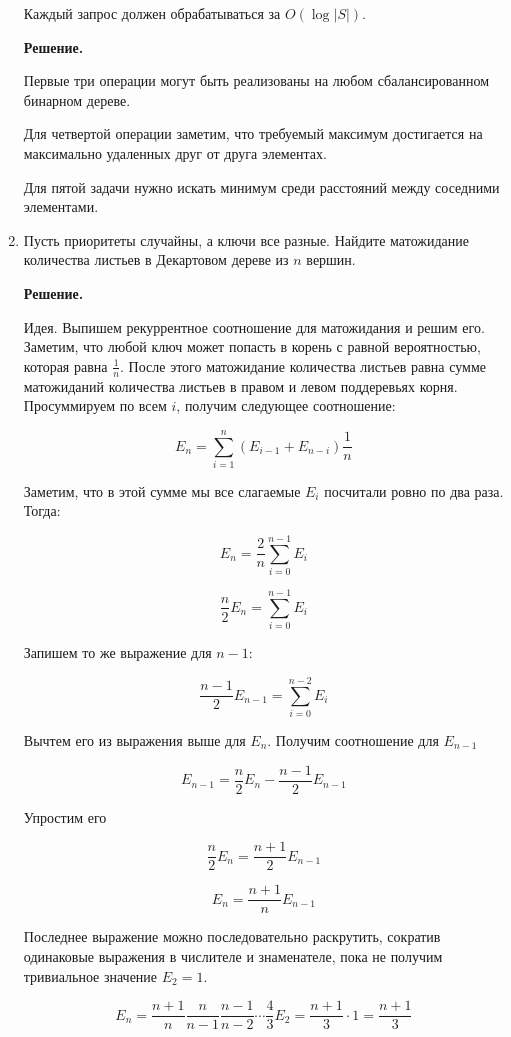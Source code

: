 \begin{enumerate}
	Каждый запрос должен обрабатываться за $O(\log |S|)$.
	
	\textbf{Решение.}
	
	Первые три операции могут быть реализованы на любом сбалансированном бинарном дереве. 
	
	Для четвертой операции заметим, что требуемый максимум достигается на максимально удаленных друг от друга элементах.
	
	Для пятой задачи нужно искать минимум среди расстояний между соседними элементами. 
	
	\item Пусть приоритеты случайны, а ключи все разные. Найдите матожидание количества листьев в
	Декартовом дереве из $n$ вершин.
	
	\textbf{Решение.}
	
	Идея. Выпишем рекуррентное соотношение для матожидания и решим его.
	Заметим, что любой ключ может попасть в корень с равной вероятностью, которая равна 
	$\frac{1}{n}$. После этого матожидание количества листьев равна сумме матожиданий количества листьев в правом и левом поддеревьях корня. Просуммируем по всем $i$, получим следующее соотношение:
	
	$$E_n = \sum\limits_{i = 1}^{n} (E_{i - 1} + E_{n - i}) \frac{1}{n}$$
	
	Заметим, что в этой сумме мы все слагаемые $E_i$ посчитали ровно по два раза. Тогда:
	
	$$E_n = \frac{2}{n} \sum\limits_{i = 0}^{n - 1} E_i$$
	
	$$\frac{n}{2} E_n = \sum\limits_{i = 0}^{n - 1} E_i$$
	
	Запишем то же выражение для $n - 1$:
	
	$$\frac{n - 1}{2}E_{n - 1} = \sum\limits_{i = 0}^{n - 2} E_i$$

	Вычтем его из выражения выше для $E_n$. Получим соотношение для $E_{n - 1}$
	
	$$E_{n - 1} = \frac{n}{2} E_{n} - \frac{n - 1}{2} E_{n - 1}$$
	
	Упростим его
	
	$$\frac{n}{2} E_n = \frac{n + 1}{2}E_{n - 1}$$
	
	$$E_n = \frac{n + 1}{n} E_{n - 1}$$
	
	Последнее выражение можно последовательно раскрутить, сократив одинаковые выражения в числителе и знаменателе, пока не получим тривиальное значение $E_2 = 1$.
	
	$$E_n = \frac{n + 1}{n} \frac{n}{n - 1} \frac{n - 1}{n - 2} \cdots \frac{4}{3} E_2 = \frac{n + 1}{3} \cdot 1 = \frac{n + 1}{3}$$
	

\end{enumerate}
